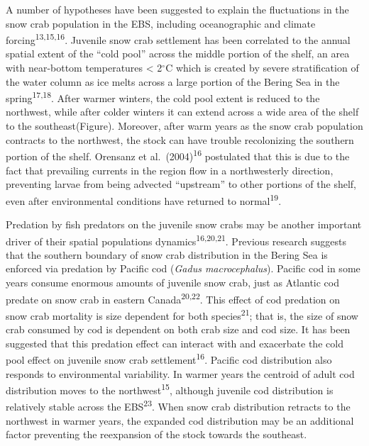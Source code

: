 \documentclass[11pt,]{article}
\begin{document}
A number of hypotheses have been suggested to explain the fluctuations in the snow crab population in the EBS, including oceanographic and climate forcing\textsuperscript{13,15,16}. Juvenile snow crab settlement has been correlated to the annual spatial extent of the ``cold pool'' across the middle portion of the shelf, an area with near-bottom temperatures \textless{} 2\(^{\circ}\)C which is created by severe stratification of the water column as ice melts across a large portion of the Bering Sea in the spring\textsuperscript{17,18}. After warmer winters, the cold pool extent is reduced to the northwest, while after colder winters it can extend across a wide area of the shelf to the southeast(Figure). Moreover, after warm years as the snow crab population contracts to the northwest, the stock can have trouble recolonizing the southern portion of the shelf. Orensanz et al.~(2004)\textsuperscript{16} postulated that this is due to the fact that prevailing currents in the region flow in a northwesterly direction, preventing larvae from being advected ``upstream'' to other portions of the shelf, even after environmental conditions have returned to normal\textsuperscript{19}.

Predation by fish predators on the juvenile snow crabs may be another important driver of their spatial populations dynamics\textsuperscript{16,20,21}. Previous research suggests that the southern boundary of snow crab distribution in the Bering Sea is enforced via predation by Pacific cod (\emph{Gadus macrocephalus}). Pacific cod in some years consume enormous amounts of juvenile snow crab, just as Atlantic cod predate on snow crab in eastern Canada\textsuperscript{20,22}. This effect of cod predation on snow crab mortality is size dependent for both species\textsuperscript{21}; that is, the size of snow crab consumed by cod is dependent on both crab size and cod size. It has been suggested that this predation effect can interact with and exacerbate the cold pool effect on juvenile snow crab settlement\textsuperscript{16}. Pacific cod distribution also responds to environmental variability. In warmer years the centroid of adult cod distribution moves to the northwest\textsuperscript{15}, although juvenile cod distribution is relatively stable across the EBS\textsuperscript{23}. When snow crab distribution retracts to the northwest in warmer years, the expanded cod distribution may be an additional factor preventing the reexpansion of the stock towards the southeast.
\end{document}
